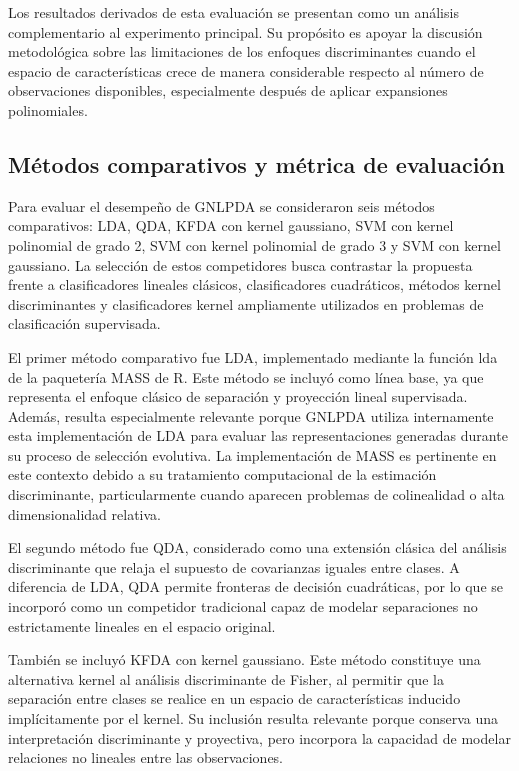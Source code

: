 Los resultados derivados de esta evaluación se presentan como un análisis complementario al experimento principal. Su propósito es apoyar la discusión metodológica sobre las limitaciones de los enfoques discriminantes cuando el espacio de características crece de manera considerable respecto al número de observaciones disponibles, especialmente después de aplicar expansiones polinomiales.

\subsection{Métodos comparativos y métrica de evaluación}

Para evaluar el desempeño de GNLPDA se consideraron seis métodos comparativos: LDA, QDA, KFDA con kernel gaussiano, SVM con kernel polinomial de grado 2, SVM con kernel polinomial de grado 3 y SVM con kernel gaussiano. La selección de estos competidores busca contrastar la propuesta frente a clasificadores lineales clásicos, clasificadores cuadráticos, métodos kernel discriminantes y clasificadores kernel ampliamente utilizados en problemas de clasificación supervisada.

El primer método comparativo fue LDA, implementado mediante la función lda de la paquetería MASS de R. Este método se incluyó como línea base, ya que representa el enfoque clásico de separación y proyección lineal supervisada. Además, resulta especialmente relevante porque GNLPDA utiliza internamente esta implementación de LDA para evaluar las representaciones generadas durante su proceso de selección evolutiva. La implementación de MASS es pertinente en este contexto debido a su tratamiento computacional de la estimación discriminante, particularmente cuando aparecen problemas de colinealidad o alta dimensionalidad relativa.

El segundo método fue QDA, considerado como una extensión clásica del análisis discriminante que relaja el supuesto de covarianzas iguales entre clases. A diferencia de LDA, QDA permite fronteras de decisión cuadráticas, por lo que se incorporó como un competidor tradicional capaz de modelar separaciones no estrictamente lineales en el espacio original.

También se incluyó KFDA con kernel gaussiano. Este método constituye una alternativa kernel al análisis discriminante de Fisher, al permitir que la separación entre clases se realice en un espacio de características inducido implícitamente por el kernel. Su inclusión resulta relevante porque conserva una interpretación discriminante y proyectiva, pero incorpora la capacidad de modelar relaciones no lineales entre las observaciones.

